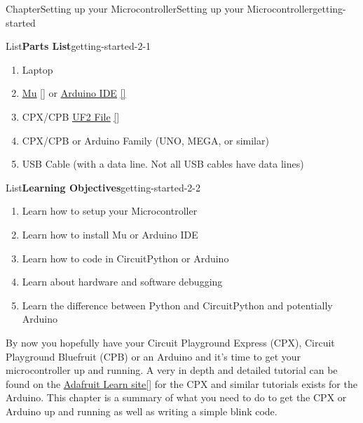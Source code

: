 \documentclass[oneside,10pt,]{book}
\newcommand{\xreffont}{\relax}
\newcommand{\linkhilite}[1]{\underline{#1}}
\numberwithin{equation}{section}
\begin{document}
%
%
\typeout{************************************************}
\typeout{************************************************}
%
\begin{chapterptx}{Chapter}{Setting up your Microcontroller}{}{Setting up your Microcontroller}{}{}{getting-started}
\renewcommand*{\chaptername}{Chapter}
\begin{introduction}{}%
\begin{listptx}{List}{\textbf{Parts List}}{getting-started-2-1}{}%
%
\begin{enumerate}
\item{}Laptop%
\item{}\href{https://codewith.mu/en/download}{\linkhilite{Mu}} \hyperlink{mu}{\linkhilite{[{\xreffont 57}]}} or \href{https://www.arduino.cc/en/software/}{\linkhilite{Arduino IDE}} \hyperlink{Arduino}{\linkhilite{[{\xreffont 35}]}}%
\item{}CPX\slash{}CPB \href{https://circuitpython.org}{\linkhilite{UF2 File}} \hyperlink{CircuitPython}{\linkhilite{[{\xreffont 30}]}}%
\item{}CPX\slash{}CPB or Arduino Family (UNO, MEGA, or similar)%
\item{}USB Cable (with a data line. Not all USB cables have data lines)%
\end{enumerate}
\end{listptx}%
\begin{listptx}{List}{\textbf{Learning Objectives}}{getting-started-2-2}{}%
%
\begin{enumerate}
\item{}Learn how to setup your Microcontroller%
\item{}Learn how to install Mu or Arduino IDE%
\item{}Learn how to code in CircuitPython or Arduino%
\item{}Learn about hardware and software debugging%
\item{}Learn the difference between Python and CircuitPython and potentially Arduino%
\end{enumerate}
\end{listptx}%
By now you hopefully have your Circuit Playground Express (CPX), Circuit Playground Bluefruit (CPB) or an Arduino and it's time to get your microcontroller up and running. A very in depth and detailed tutorial can be found on the \href{https://learn.adafruit.com/circuitpython-made-easy-on-circuit-playground-express/first-things-first}{\linkhilite{Adafruit Learn site}}\hyperlink{Adafruit}{\linkhilite{[{\xreffont 32}]}} for the CPX and similar tutorials exists for the Arduino. This chapter is a summary of what you need to do to get the CPX or Arduino up and running as well as writing a simple blink code.%

\end{introduction}
\end{chapterptx}
\end{document}
